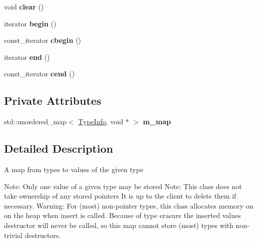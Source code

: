 \begin{DoxyCompactItemize}
\mbox{\label{classnta_1_1utils_1_1TypeMap_ab183b8f3fb5b6eddb3e76d98a8bd237d}} 
void {\bfseries clear} ()
\item 
\mbox{\label{classnta_1_1utils_1_1TypeMap_a69008174ebe18720da3e56bed8029f75}} 
iterator {\bfseries begin} ()
\item 
\mbox{\label{classnta_1_1utils_1_1TypeMap_ae6eb2b2514495c12ad7166a8aeabf2e0}} 
const\+\_\+iterator {\bfseries cbegin} ()
\item 
\mbox{\label{classnta_1_1utils_1_1TypeMap_aea9a528186ccd2094779a5308fdfb247}} 
iterator {\bfseries end} ()
\item 
\mbox{\label{classnta_1_1utils_1_1TypeMap_ada125db6983695a38d039023db8ee5ee}} 
const\+\_\+iterator {\bfseries cend} ()
\end{DoxyCompactItemize}
\subsection*{Private Attributes}
\begin{DoxyCompactItemize}
\item 
\mbox{\label{classnta_1_1utils_1_1TypeMap_a73c41f6494b48e4c921275b8767b517e}} 
std\+::unordered\+\_\+map$<$ \hyperlink{structnta_1_1utils_1_1TypeInfo}{Type\+Info}, void $\ast$ $>$ {\bfseries m\+\_\+map}
\end{DoxyCompactItemize}


\subsection{Detailed Description}
A map from types to values of the given type

Note\+: Only one value of a given type may be stored Note\+: This class does not take ownership of any stored pointers It is up to the client to delete them if necessary. Warning\+: For (most) non-\/pointer types, this class allocates memory on on the heap when insert is called. Because of type erasure the inserted value\textquotesingle{}s destructor will never be called, so this map cannot store (most) types with non-\/trivial destructors. 

